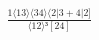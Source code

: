 \documentclass[varwidth, border=5pt]{standalone}
\begin{document}
\begin{my}
$\begin{gathered}
\scriptscriptstyle\frac{1⟨13⟩⟨34⟩⟨2|3+4|2]}{⟨12⟩³[24]}
\end{gathered}$
\end{my}
\end{document}
